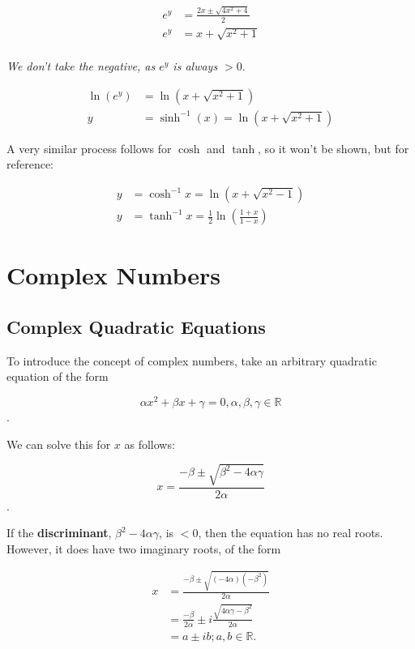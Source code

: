\documentclass[12pt]{article}
\begin{document}
\begin{equation}
    \begin{split}
        e^y &= \frac{2x \pm \sqrt{4x^2+4}}{2}\\
        e^y &= x + \sqrt{x^2+1}\\
    \end{split}
\end{equation}

\textit{We don't take the negative, as $e^y$ is always $>0$}.

\begin{equation}
    \begin{split}
        \ln(e^y) &= \ln(x+\sqrt{x^2+1})\\
        y &= \sinh^{-1}(x) = \ln(x+\sqrt{x^2+1})
    \end{split}
\end{equation}

A very similar process follows for $\cosh$ and $\tanh$, so it won't be shown, but for reference:

\begin{equation}
    \begin{split}
        y &= \cosh^{-1}x = \ln(x+\sqrt{x^2-1})\\
        y &= \tanh^{-1}x = \frac{1}{2} \ln(\frac{1+x}{1-x})
    \end{split}
\end{equation}

\newpage
\section{Complex Numbers}\label{complex}
\subsection{Complex Quadratic Equations}
To introduce the concept of complex numbers, take an arbitrary quadratic equation of the form 

$$\alpha x^2 + \beta x + \gamma = 0, \alpha, \beta, \gamma \in \mathbb{R}$$.

We can solve this for $x$ as follows:

$$x = \frac{-\beta \pm \sqrt{\beta^2-4\alpha\gamma}}{2\alpha}$$.

If the \textbf{discriminant}, $\beta^2-4\alpha\gamma$, is $<0$, then the equation has no real roots. However, it does have two imaginary roots, of the form

\begin{equation}
    \begin{split}
        x &= \frac{-\beta \pm \sqrt{(-4\alpha)(-\beta^2)}}{2\alpha}\\
        &= \frac{-\beta}{2\alpha} \pm i \frac{\sqrt{4 \alpha \gamma - \beta^2}}{2 \alpha}\\
        &= a \pm  ib; a,b \in \mathbb{R}.
    \end{split}
\end{equation}
\end{document}

